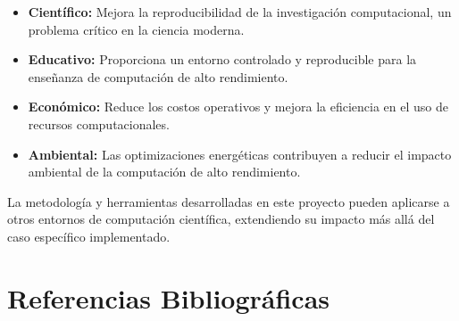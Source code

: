 \documentclass[12pt,a4paper]{report}
\begin{document}
\begin{itemize}
    \item[\textcolor{cientigo-blue}{\faStar}] \textbf{Científico:} Mejora la reproducibilidad de la investigación computacional, un problema crítico en la ciencia moderna.
    
    \item[\textcolor{cientigo-blue}{\faStar}] \textbf{Educativo:} Proporciona un entorno controlado y reproducible para la enseñanza de computación de alto rendimiento.
    
    \item[\textcolor{cientigo-blue}{\faStar}] \textbf{Económico:} Reduce los costos operativos y mejora la eficiencia en el uso de recursos computacionales.
    
    \item[\textcolor{cientigo-blue}{\faStar}] \textbf{Ambiental:} Las optimizaciones energéticas contribuyen a reducir el impacto ambiental de la computación de alto rendimiento.
\end{itemize}

La metodología y herramientas desarrolladas en este proyecto pueden aplicarse a otros entornos de computación científica, extendiendo su impacto más allá del caso específico implementado.

\chapter{Referencias Bibliográficas}
\end{document}
